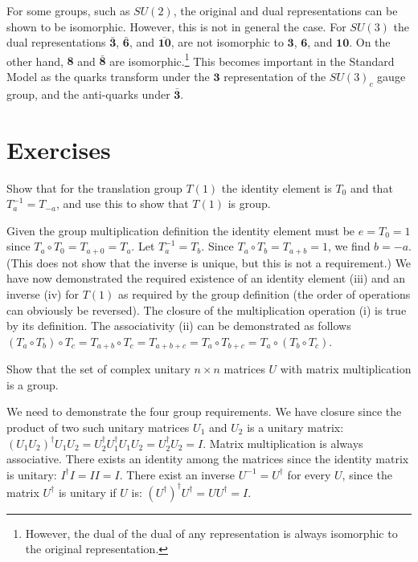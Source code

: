\documentclass[notes.tex]{subfiles}
\begin{document}
For some groups, such as $SU(2)$, the original and dual representations can be shown to be isomorphic. However, this is not in general the case. For $SU(3)$ the dual representations $\mathbf {\bar 3}$, $\mathbf {\bar 6}$, and $\mathbf{\overline{10}}$, are not isomorphic to $\mathbf 3$, $\mathbf 6$, and $\mathbf{10}$. On the other hand, $\mathbf 8$ and $\mathbf {\bar 8}$ are isomorphic.\footnote{However, the dual of the dual of any representation is always isomorphic to the original representation.} This becomes important in the Standard Model as the quarks transform under the $\mathbf 3$ representation of the $SU(3)_c$ gauge group, and the anti-quarks under $\mathbf {\bar 3}$.





\section{Exercises}
\begin{Exercise}[]
Show that for the translation group $T(1)$ the identity element is $T_0$ and that $T_a^{-1} = T_{-a}$, and use this to show that $T(1)$ is group.
\end{Exercise}

\begin{Answer}
Given the group multiplication definition the identity element must be $e=T_0=1$ since $T_a\circ T_0=T_{a+0}=T_a$. Let $T_a^{-1} =T_b$. Since $T_a \circ T_b=T_{a+b}=1$, we find $b=-a$. (This does not show that the inverse is unique, but this is not a requirement.) We have now demonstrated the required existence of an identity element (iii) and an inverse (iv) for $T(1)$ as required by the group definition (the order of operations can obviously be reversed). The closure of the multiplication operation (i) is true by its definition. The associativity (ii) can be demonstrated as follows $(T_a\circ T_b)\circ T_c=T_{a+b}\circ T_c=T_{a+b+c}=T_{a}\circ T_{b+c}=T_a\circ (T_b\circ T_c)$.
\end{Answer}

\begin{Exercise}[]
Show that the set of complex unitary $n\times n$ matrices $U$ with matrix multiplication is a group.
\end{Exercise}
\begin{Answer}
We need to demonstrate the four group requirements. We have closure since the product of two such unitary matrices $U_1$ and $U_2$ is a unitary matrix: $(U_1U_2)^\dagger U_1U_2= U_2^\dagger U_1^\dagger U_1U_2= U_2^\dagger U_2=I$. Matrix multiplication is always associative. There exists an identity among the matrices since the identity matrix is unitary: $I^\dagger I = II=I$. There exist an inverse $U^{-1}=U^\dagger$ for every $U$, since the matrix $U^\dagger$ is unitary if $U$ is: $(U^\dagger)^\dagger U^\dagger= UU^\dagger=I$.
\end{Answer}
\end{document}
